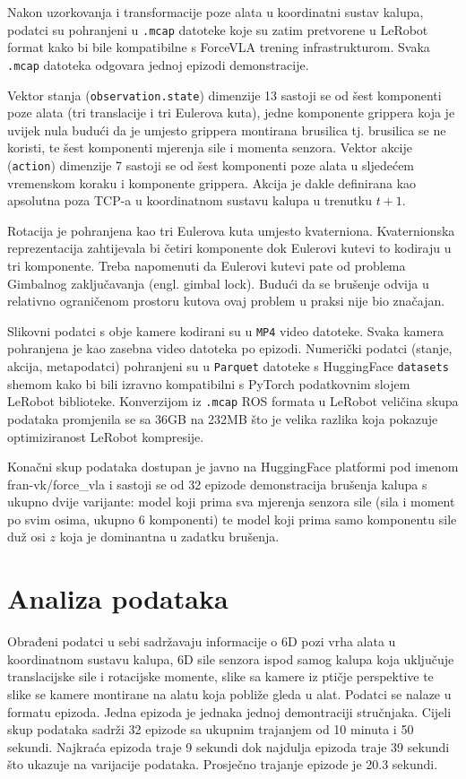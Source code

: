 \documentclass[times, utf8, diplomski]{fer}
\begin{document}
Nakon uzorkovanja i transformacije poze alata u koordinatni sustav kalupa, podatci su pohranjeni u \texttt{.mcap} datoteke koje su zatim pretvorene u LeRobot format kako bi bile kompatibilne s ForceVLA trening infrastrukturom. Svaka \texttt{.mcap} datoteka odgovara jednoj epizodi demonstracije.

Vektor stanja (\texttt{observation.state}) dimenzije 13 sastoji se od šest komponenti poze alata (tri translacije i tri Eulerova kuta), jedne komponente grippera koja je uvijek nula budući da je umjesto grippera montirana brusilica tj. brusilica se ne koristi, te šest komponenti mjerenja sile i momenta senzora. Vektor akcije (\texttt{action}) dimenzije 7 sastoji se od šest komponenti poze alata u sljedećem vremenskom koraku i komponente grippera. Akcija je dakle definirana kao apsolutna poza TCP-a u koordinatnom sustavu kalupa u trenutku $t+1$.

Rotacija je pohranjena kao tri Eulerova kuta umjesto kvaterniona. Kvaternionska reprezentacija zahtijevala bi četiri komponente dok Eulerovi kutevi to kodiraju u tri komponente. Treba napomenuti da Eulerovi kutevi pate od problema Gimbalnog zaključavanja (engl. gimbal lock). Budući da se brušenje odvija u relativno ograničenom prostoru kutova ovaj problem u praksi nije bio značajan.

Slikovni podatci s obje kamere kodirani su u \texttt{MP4} video datoteke. Svaka kamera pohranjena je kao zasebna video datoteka po epizodi. Numerički podatci (stanje, akcija, metapodatci) pohranjeni su u \texttt{Parquet} datoteke s HuggingFace \texttt{datasets} shemom kako bi bili izravno kompatibilni s PyTorch podatkovnim slojem LeRobot biblioteke. Konverzijom iz \texttt{.mcap} ROS formata u LeRobot veličina skupa podataka promjenila se sa 36GB na 232MB što je velika razlika koja pokazuje optimiziranost LeRobot kompresije.

Konačni skup podataka dostupan je javno na HuggingFace platformi pod imenom fran-vk/force\_vla i sastoji se od 32 epizode demonstracija brušenja kalupa s ukupno dvije varijante: model koji prima sva mjerenja senzora sile (sila i moment po svim osima, ukupno 6 komponenti) te model koji prima samo komponentu sile duž osi $z$ koja je dominantna u zadatku brušenja.

\section{Analiza podataka}

Obrađeni podatci u sebi sadržavaju informacije o 6D pozi vrha alata u koordinatnom sustavu kalupa, 6D sile senzora ispod samog kalupa koja uključuje translacijske sile i rotacijske momente, slike sa kamere iz ptičje perspektive te slike se kamere montirane na alatu koja pobliže gleda u alat. Podatci se nalaze u formatu epizoda. Jedna epizoda je jednaka jednoj demontraciji stručnjaka. Cijeli skup podataka sadrži 32 epizode sa ukupnim trajanjem od 10 minuta i 50 sekundi. Najkraća epizoda traje 9 sekundi dok najdulja epizoda traje 39 sekundi što ukazuje na varijacije podataka. Prosječno trajanje epizode je 20.3 sekundi.
\end{document}
